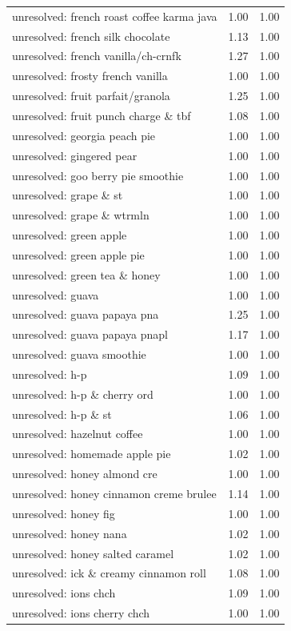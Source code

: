 \begin{table}
\begin{tabular}{lrr}
unresolved: french roast coffee karma java & 1.00 & 1.00 \\
unresolved: french silk chocolate & 1.13 & 1.00 \\
unresolved: french vanilla/ch-crnfk & 1.27 & 1.00 \\
unresolved: frosty french vanilla & 1.00 & 1.00 \\
unresolved: fruit parfait/granola & 1.25 & 1.00 \\
unresolved: fruit punch charge \& tbf & 1.08 & 1.00 \\
unresolved: georgia peach pie & 1.00 & 1.00 \\
unresolved: gingered pear & 1.00 & 1.00 \\
unresolved: goo berry pie smoothie & 1.00 & 1.00 \\
unresolved: grape \& st & 1.00 & 1.00 \\
unresolved: grape \& wtrmln & 1.00 & 1.00 \\
unresolved: green apple & 1.00 & 1.00 \\
unresolved: green apple pie & 1.00 & 1.00 \\
unresolved: green tea \& honey & 1.00 & 1.00 \\
unresolved: guava & 1.00 & 1.00 \\
unresolved: guava papaya pna & 1.25 & 1.00 \\
unresolved: guava papaya pnapl & 1.17 & 1.00 \\
unresolved: guava smoothie & 1.00 & 1.00 \\
unresolved: h-p & 1.09 & 1.00 \\
unresolved: h-p \& cherry ord & 1.00 & 1.00 \\
unresolved: h-p \& st & 1.06 & 1.00 \\
unresolved: hazelnut coffee & 1.00 & 1.00 \\
unresolved: homemade apple pie & 1.02 & 1.00 \\
unresolved: honey almond cre & 1.00 & 1.00 \\
unresolved: honey cinnamon creme brulee & 1.14 & 1.00 \\
unresolved: honey fig & 1.00 & 1.00 \\
unresolved: honey nana & 1.02 & 1.00 \\
unresolved: honey salted caramel & 1.02 & 1.00 \\
unresolved: ick \& creamy cinnamon roll & 1.08 & 1.00 \\
unresolved: ions chch & 1.09 & 1.00 \\
unresolved: ions cherry chch & 1.00 & 1.00 \\

\end{tabular}
\end{table}

